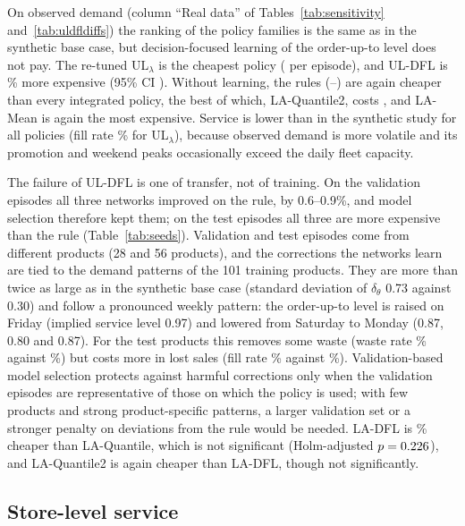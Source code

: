 On observed demand (column ``Real data'' of Tables~\ref{tab:sensitivity} and~\ref{tab:uldfldiffs}) the ranking of the policy families is the same as in the synthetic base case, but decision-focused learning of the order-up-to level does not pay. The re-tuned UL$_\lambda$ is the cheapest policy (\costULFresh{} per episode), and UL-DFL is \ULabsrelULFresh\% more expensive (95\% CI \ULciULFresh{}). Without learning, the rules (\costULFresh--\costBSPEWFresh) are again cheaper than every integrated policy, the best of which, LA-Quantile2, costs \costLAQTwoFresh{}, and LA-Mean is again the most expensive. Service is lower than in the synthetic study for all policies (fill rate \fillULFresh\% for UL$_\lambda$), because observed demand is more volatile and its promotion and weekend peaks occasionally exceed the daily fleet capacity.

The failure of UL-DFL is one of transfer, not of training. On the validation episodes all three networks improved on the rule, by 0.6--0.9\%, and model selection therefore kept them; on the test episodes all three are more expensive than the rule (Table~\ref{tab:seeds}). Validation and test episodes come from different products (28 and 56 products), and the corrections the networks learn are tied to the demand patterns of the 101 training products. They are more than twice as large as in the synthetic base case (standard deviation of $\delta_\theta$ 0.73 against 0.30) and follow a pronounced weekly pattern: the order-up-to level is raised on Friday (implied service level 0.97) and lowered from Saturday to Monday (0.87, 0.80 and 0.87). For the test products this removes some waste (waste rate \wasteULDFLFresh\% against \wasteULFresh\%) but costs more in lost sales (fill rate \fillULDFLFresh\% against \fillULFresh\%). Validation-based model selection protects against harmful corrections only when the validation episodes are representative of those on which the policy is used; with few products and strong product-specific patterns, a larger validation set or a stronger penalty on deviations from the rule would be needed. LA-DFL is \absrelLAQFresh\% cheaper than LA-Quantile, which is not significant (Holm-adjusted $p=0.226$), and LA-Quantile2 is again cheaper than LA-DFL, though not significantly.

\subsection{Store-level service}\label{sec:stores}

